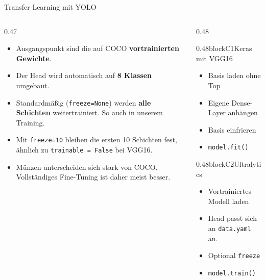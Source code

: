 
\begin{frame}{Transfer Learning mit YOLO}
\footnotesize
{}
\begin{columns}
\begin{column}{0.47\textwidth}
\begin{itemize}
  \item Ausgangspunkt sind die auf COCO \textbf{vortrainierten Gewichte}.
  \item Der Head wird automatisch auf \textbf{8 Klassen} umgebaut.
  \item Standardmäßig (\texttt{freeze=None}) werden \textbf{alle Schichten} weitertrainiert. So auch in unserem Training.
  \item Mit \texttt{freeze=10} bleiben die ersten 10 Schichten fest, ähnlich zu \texttt{trainable = False} bei VGG16.
  \item Münzen unterscheiden sich stark von COCO. Vollständiges Fine-Tuning ist daher meist besser.
\end{itemize}
\end{column}
\begin{column}{0.48\textwidth}
\begin{blockrow}
  \begin{blockcol}{0.48\linewidth}{blockC1}{Keras mit VGG16}
    \begin{itemize}
      \item Basis laden ohne Top
      \item Eigene Dense-Layer anhängen
      \item Basis einfrieren
      \item \texttt{model.fit()}
    \end{itemize}
  \end{blockcol}
  \begin{blockcol}{0.48\linewidth}{blockC2}{Ultralytics}
    \begin{itemize}
      \item Vortrainiertes Modell laden
      \item Head passt sich an \texttt{data.yaml} an.
      \item Optional \texttt{freeze}
      \item \texttt{model.train()}
    \end{itemize}
  \end{blockcol}
\end{blockrow}
\end{column}
\end{columns}
\end{frame}


